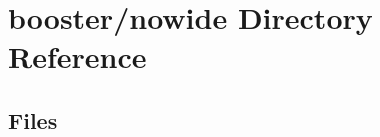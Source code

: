 \section{booster/nowide Directory Reference}
\label{dir_cc56e8e31021b236a9882130c9796a41}
\subsection*{Files}
\begin{DoxyCompactItemize}
\end{DoxyCompactItemize}
